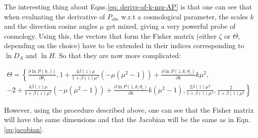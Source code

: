 The interesting thing about Eqns.\ref{eq: derivs-of-k-mu-AP} is that
one can see that when evaluating the derivative of $P_{obs}$ w.r.t
a cosmological parameter, the scales $k$ and the direction cosine
angles $\mu$ get mixed, giving a very powerful probe of cosmology.
Using this, the vectors that form the Fisher matrix (either $\zeta$
or $\Theta$, depending on the choice) have to be extended in their
indices corresponding to $\ln D_{A}$ and $\ln H$. So that they are
now more complicated:

\begin{multline}
\Theta=\left\{ \frac{\partial\ln P(k,\bar{z})}{\partial\theta_{i}},1+\frac{4\beta(z)\mu}{1+\beta(z)\mu^{2}}(-\mu(\mu^{2}-1))+\frac{\partial\ln P\left(\bar{z},k;\theta_{i}\right)}{\partial k}k\mu^{2},\right.\\
\left.-2+\frac{4\beta(z)\mu}{1+\beta(z)\mu^{2}}(-\mu(\mu^{2}-1))+\frac{\partial\ln P\left(\bar{z},k;\theta_{i}\right)}{\partial k}k(\mu^{2}-1),\frac{2\beta(\bar{z})\mu^{2}}{1+\beta(\bar{z})\mu^{2}},\frac{2}{1+\beta(\bar{z})\mu^{2}}\right\} 
\end{multline}


However, using the procedure described above, one can see that the
Fisher matrix will have the same dimensions and that the Jacobian
will be the same as in Eqn. \ref{eq:jacobian}.


%



